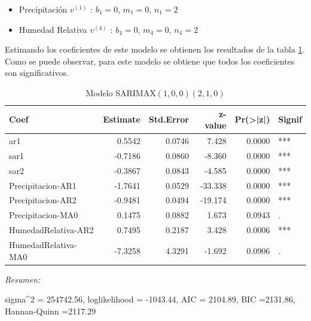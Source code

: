 \documentclass[12pt,oneside]{book}\usepackage[]{graphicx}\usepackage[]{color}
\newenvironment{knitrout}{}{} %
\theoremstyle{definition} %
\begin{document}
\begin{itemize}
\item Precipitación $v^{(1)}$ : $b_1= 0$, $m_1=0$, $n_1=2$
\item Humedad Relativa $v^{(4)}$ : $b_4= 0$, $m_4=0$, $n_4=2$
\end{itemize}


Estimando los coeficientes de este modelo se obtienen los resultados de la tabla \ref{tab:sarimax_estim3}. Como se puede observar, para este modelo se obtiene que todos los coeficientes son significativos. 


\begin{knitrout}
\color{fgcolor}\begin{table}

\caption{\label{tab:unnamed-chunk-56}\label{tab:sarimax_estim3}Modelo SARIMAX$(1,0,0)(2,1,0)$}
\centering
\begin{threeparttable}
\begin{tabular}[t]{lrrrrl}
\toprule
Coef & Estimate & Std.Error & z-value & Pr(>|z|) & Signif\\
\midrule
\rowcolor{gray!6}  ar1 & 0.5542 & 0.0746 & 7.428 & 0.0000 & ***\\
sar1 & -0.7186 & 0.0860 & -8.360 & 0.0000 & ***\\
\rowcolor{gray!6}  sar2 & -0.3867 & 0.0843 & -4.585 & 0.0000 & ***\\
Precipitacion-AR1 & -1.7641 & 0.0529 & -33.338 & 0.0000 & ***\\
\rowcolor{gray!6}  Precipitacion-AR2 & -0.9481 & 0.0494 & -19.174 & 0.0000 & ***\\
\addlinespace
Precipitacion-MA0 & 0.1475 & 0.0882 & 1.673 & 0.0943 & .\\
\rowcolor{gray!6}  HumedadRelativa-AR2 & 0.7495 & 0.2187 & 3.428 & 0.0006 & ***\\
HumedadRelativa-MA0 & -7.3258 & 4.3291 & -1.692 & 0.0906 & .\\
\bottomrule
\end{tabular}
\begin{tablenotes}
\item \textit{Resumen:} 
\item sigma\textasciicircum{}2 = 254742.56, loglikelihood = -1043.44, AIC = 2104.89, BIC =2131.86, Hannan-Quinn =2117.29
\end{tablenotes}
\end{threeparttable}
\end{table}


\end{knitrout}
\end{document}
